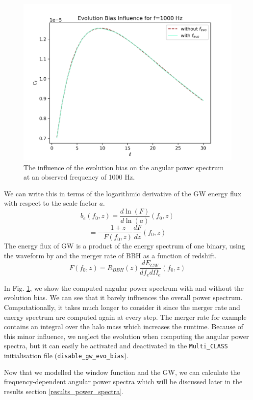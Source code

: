 \begin{figure}
    \centering
    \includegraphics[width=0.8\linewidth]{Images/evo_bias_test.png}
    \caption{The influence of the evolution bias on the angular power spectrum at an observed frequency of 1000 Hz.}
    \label{evo_bias_plot}
\end{figure} 

We can write this in terms of the logarithmic derivative of the GW energy flux with respect to the scale factor $a$.
\begin{equation}
    b_e(f_0, z) = \frac{d\ln(F)}{d\ln(a)}(f_0, z)
\end{equation}
\begin{equation}
    = -\frac{1+z}{F(f_0, z)}\frac{dF}{dz}(f_0, z)
\end{equation}
The energy flux of GW is a product of the energy spectrum of one binary, using the waveform by \cite{ajith_inspiral-merger-ringdown_2011} and the merger rate of BBH as a function of redshift.
\begin{equation}
    F(f_0, z) = R_{BBH}(z) \frac{d E_{GW}}{df_e d\Omega_e}(f_0, z)
\end{equation}



In Fig. \ref{evo_bias_plot}, we show the computed angular power spectrum with and without the evolution bias. We can see that it barely influences the overall power spectrum. Computationally, it takes much longer to consider it since the merger rate and energy spectrum are computed again at every step. The merger rate for example contains an integral over the halo mass which increases the runtime.
Because of this minor influence, we neglect the evolution when computing the angular power spectra, but it can easily be activated and deactivated in the {\tt Multi\_CLASS} initialisation file ({\tt disable\_gw\_evo\_bias}).

Now that we modelled the window function and the GW, we can calculate the frequency-dependent angular power spectra which will be discussed later in the results section \ref{results_power_spectra}.
